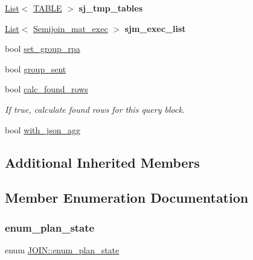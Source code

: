 \begin{DoxyCompactItemize}
\mbox{\label{classJOIN_a482cba72534a769e51ff81019ccbea3c}} 
\mbox{\hyperlink{classList}{List}}$<$ \mbox{\hyperlink{structTABLE}{T\+A\+B\+LE}} $>$ {\bfseries sj\+\_\+tmp\+\_\+tables}
\item 
\mbox{\label{classJOIN_ab490f36367cdfd30ca601b3df06aa539}} 
\mbox{\hyperlink{classList}{List}}$<$ \mbox{\hyperlink{classSemijoin__mat__exec}{Semijoin\+\_\+mat\+\_\+exec}} $>$ {\bfseries sjm\+\_\+exec\+\_\+list}
\item 
bool \mbox{\hyperlink{classJOIN_aaf4e8ed1fc6de12c4faeb43fd31439c3}{set\+\_\+group\+\_\+rpa}}
\item 
bool \mbox{\hyperlink{classJOIN_a988da063141c9923352565697bdf3c78}{group\+\_\+sent}}
\item 
\mbox{\label{classJOIN_a0bd7e728e0241d1dbead24ad49febee5}} 
bool \mbox{\hyperlink{classJOIN_a0bd7e728e0241d1dbead24ad49febee5}{calc\+\_\+found\+\_\+rows}}
\begin{DoxyCompactList}\small\item\em If true, calculate found rows for this query block. \end{DoxyCompactList}\item 
bool \mbox{\hyperlink{classJOIN_a82f34e62a218c8ac3871e0dd32ccc8a3}{with\+\_\+json\+\_\+agg}}
\end{DoxyCompactItemize}
\subsection*{Additional Inherited Members}


\subsection{Member Enumeration Documentation}
\mbox{\label{classJOIN_a965b8cb3ded4b0e826a3cab5f7d88694}} 
\subsubsection{\texorpdfstring{enum\+\_\+plan\+\_\+state}{enum\_plan\_state}}
{\footnotesize\ttfamily enum \mbox{\hyperlink{classJOIN_a965b8cb3ded4b0e826a3cab5f7d88694}{J\+O\+I\+N\+::enum\+\_\+plan\+\_\+state}}}



